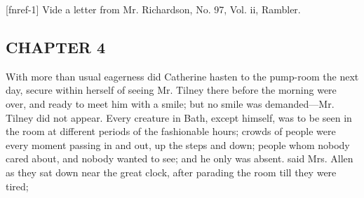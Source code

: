 \useURL[url5][][][]\from[url5] \goto{{[}1{]}}[fnref-1] Vide a letter from Mr. Richardson, No. 97, Vol. ii, Rambler.

\subsection[chapter-4]{\useURL[url6][][][]\from[url6]CHAPTER 4}

With more than usual eagerness did Catherine hasten to the pump-room the next day, secure within herself of seeing Mr. Tilney there before the morning were over, and ready to meet him with a smile; but no smile was demanded---Mr. Tilney did not appear. Every creature in Bath, except himself, was to be seen in the room at different periods of the fashionable hours; crowds of people were every moment passing in and out, up the steps and down; people whom nobody cared about, and nobody wanted to see; and he only was absent.  said Mrs. Allen as they sat down near the great clock, after parading the room till they were tired; 

